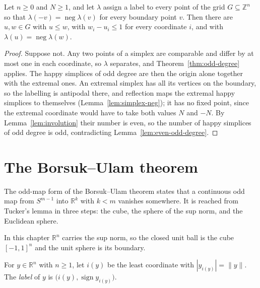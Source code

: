 \begin{theorem}
\label{thm:tucker}
\leanok
{}
Let $n \ge 0$ and $N \ge 1$, and let $\lambda$ assign a label to every point of the
grid $G \subseteq \mathbb{Z}^n$ so that
$\lambda(-v) = \operatorname{neg} \lambda(v)$ for every boundary point $v$. Then there
are $u, w \in G$ with $u \le w$, with $w_i - u_i \le 1$ for every coordinate $i$, and
with $\lambda(u) = \operatorname{neg} \lambda(w)$.
\end{theorem}
\begin{proof}
\leanok
{}
Suppose not. Any two points of a simplex are comparable and differ by at most one in
each coordinate, so $\lambda$ separates, and Theorem~\ref{thm:odd-degree} applies. The
happy simplices of odd degree are then the origin alone together with the extremal
ones. An extremal simplex has all its vertices on the boundary, so the labelling is
antipodal there, and reflection maps the extremal happy simplices to themselves
(Lemma~\ref{lem:simplex-neg}); it has no fixed point, since the extremal coordinate
would have to take both values $N$ and $-N$. By Lemma~\ref{lem:involution} their number
is even, so the number of happy simplices of odd degree is odd, contradicting
Lemma~\ref{lem:even-odd-degree}.
\end{proof}

\chapter{The Borsuk--Ulam theorem}
\label{ch:borsuk}

The odd-map form of the Borsuk--Ulam theorem \cite{Borsuk33} states that a continuous
odd map from $S^{m-1}$ into $\mathbb{R}^k$ with $k < m$ vanishes somewhere. It is
reached from Tucker's lemma in three steps: the cube, the sphere of the sup norm, and
the Euclidean sphere.

In this chapter $\mathbb{R}^n$ carries the sup norm, so the closed unit ball is the
cube $[-1, 1]^n$ and the unit sphere is its boundary.

\begin{definition}
\label{def:max-label}
\leanok
{}
For $y \in \mathbb{R}^n$ with $n \ge 1$, let $i(y)$ be the least coordinate with
$|y_{i(y)}| = \|y\|$. The \emph{label} of $y$ is $\bigl( i(y), \operatorname{sign}
y_{i(y)} \bigr)$.
\end{definition}

